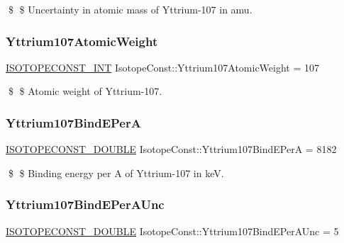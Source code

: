 \$ \$ Uncertainty in atomic mass of Yttrium-\/107 in amu. \mbox{\label{group___isotope_const-_yttrium-_y107_ga45687d8e4e1bbdc3989a8a6e6c5228a4}} 
\subsubsection{\texorpdfstring{Yttrium107\+Atomic\+Weight}{Yttrium107AtomicWeight}}
{\footnotesize\ttfamily \mbox{\hyperlink{group___isotope_const-_macros_ga5f18360b3e99483a35c32d789e62621c}{I\+S\+O\+T\+O\+P\+E\+C\+O\+N\+S\+T\+\_\+\+I\+NT}} Isotope\+Const\+::\+Yttrium107\+Atomic\+Weight = 107}

\$ \$ Atomic weight of Yttrium-\/107. \mbox{\label{group___isotope_const-_yttrium-_y107_gae1e8f669f187f6125959b0d0ff9fc757}} 
\subsubsection{\texorpdfstring{Yttrium107\+Bind\+E\+PerA}{Yttrium107BindEPerA}}
{\footnotesize\ttfamily \mbox{\hyperlink{group___isotope_const-_macros_ga8f45a7272ce02c0b4c65c44636ed719a}{I\+S\+O\+T\+O\+P\+E\+C\+O\+N\+S\+T\+\_\+\+D\+O\+U\+B\+LE}} Isotope\+Const\+::\+Yttrium107\+Bind\+E\+PerA = 8182}

\$ \$ Binding energy per A of Yttrium-\/107 in keV. \mbox{\label{group___isotope_const-_yttrium-_y107_ga978a900fd6ddd4ab30acffa95b674445}} 
\subsubsection{\texorpdfstring{Yttrium107\+Bind\+E\+Per\+A\+Unc}{Yttrium107BindEPerAUnc}}
{\footnotesize\ttfamily \mbox{\hyperlink{group___isotope_const-_macros_ga8f45a7272ce02c0b4c65c44636ed719a}{I\+S\+O\+T\+O\+P\+E\+C\+O\+N\+S\+T\+\_\+\+D\+O\+U\+B\+LE}} Isotope\+Const\+::\+Yttrium107\+Bind\+E\+Per\+A\+Unc = 5}


